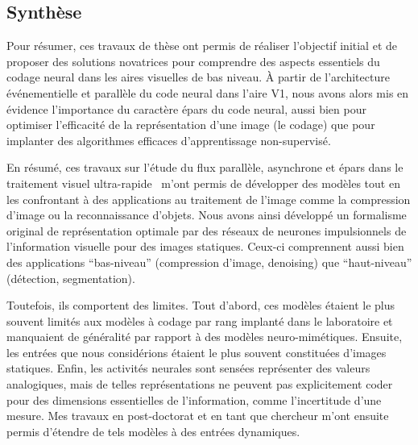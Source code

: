 \documentclass[11pt,french,a4paper,oneside]{article}%
\begin{document}
\subsection{Synthèse}
Pour résumer, ces travaux de thèse ont permis de réaliser l'objectif initial et de proposer des solutions novatrices pour comprendre des aspects essentiels du codage neural dans les aires visuelles de bas niveau. À partir de l'architecture événementielle et parallèle du code neural dans l'aire V1, nous avons alors mis en évidence l'importance du caractère épars du code neural, aussi bien pour optimiser l'efficacité de la représentation d'une image (le codage) que pour implanter des algorithmes efficaces d'apprentissage non-supervisé.

En résumé, ces travaux sur l'étude du flux parallèle, asynchrone et épars dans le traitement visuel ultra-rapide~\citep{Perrinet03these} m'ont permis de développer des modèles tout en les confrontant à des applications au traitement de l'image comme la compression d'image ou la reconnaissance d'objets. Nous avons ainsi développé un formalisme original de représentation optimale par des réseaux de neurones impulsionnels de l'information visuelle pour des images statiques. Ceux-ci comprennent aussi bien des applications ``bas-niveau'' (compression d'image, denoising) que ``haut-niveau'' (détection, segmentation). %

Toutefois, ils comportent des limites. Tout d'abord, ces modèles étaient le plus souvent limités aux modèles à codage par rang implanté dans le laboratoire et manquaient de généralité par rapport à des modèles neuro-mimétiques. Ensuite, les entrées que nous considérions étaient le plus souvent constituées d'images statiques. Enfin, les activités neurales sont sensées représenter des valeurs analogiques, mais de telles représentations ne peuvent pas explicitement coder pour des dimensions essentielles de l'information, comme l'incertitude d'une mesure. Mes travaux en post-doctorat et en tant que chercheur m'ont ensuite permis d'étendre de tels modèles à des entrées dynamiques. %
\end{document}
